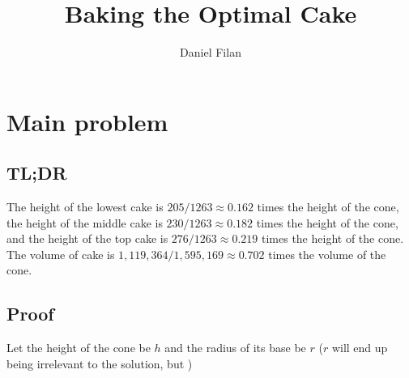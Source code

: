 \documentclass[12pt]{article}
\title{Baking the Optimal Cake}
\author{Daniel Filan}
\begin{document}

\maketitle

\section{Main problem}
\label{sec:main-problem}

\subsection{TL;DR}
\label{sec:tl-dr}

The height of the lowest cake is $205/1263 \approx 0.162$ times the height of the cone, the height of the middle cake is $230/1263 \approx 0.182$ times the height of the cone, and the height of the top cake is $276/1263 \approx 0.219$ times the height of the cone. The volume of cake is $1,119,364/1,595,169 \approx 0.702$ times the volume of the cone.

\subsection{Proof}
\label{sec:proof}

Let the height of the cone be $h$ and the radius of its base be $r$ ($r$ will end up being irrelevant to the solution, but )
\end{document}
